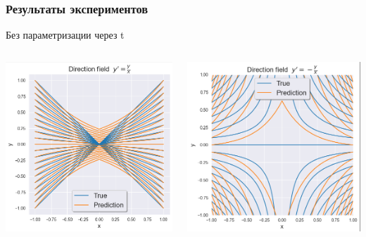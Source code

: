 \documentclass[8pt]{beamer}
\begin{document}
\begin{frame}
	\frametitle{Результаты экспериментов}
	\begin{block}{Без параметризации через t}
		\begin{columns}
			\begin{column}{0.5\textwidth}
				\begin{center}
					\includegraphics[scale = 0.37]{bad_uniform.png}
				\end{center}				
			\end{column}
			\begin{column}{0.5\textwidth}
				\begin{center}
					\includegraphics[scale = 0.37]{bad_saddle.png}

\end{center}
\end{column}
\end{columns}
\end{block}
\end{frame}
\end{document}
